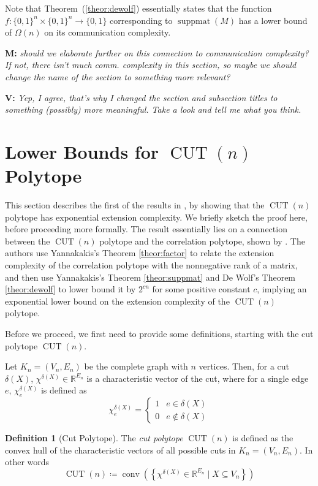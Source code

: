 \documentclass{article}
\theoremstyle{definition}
\newtheorem{definition}[theorem]{Definition}
\theoremstyle{remark}
\newcommand{\bits}{\{0,1\}}
\newcommand{\conv}{\operatorname{conv}}
\newcommand{\suppmat}{\operatorname{suppmat}}
\newcommand{\CUT}{\operatorname{CUT}}
\renewcommand{\R}{\mathbb{R}}
\newcommand{\vnote}[1]{{\color{magenta}\noindent\textbf{V: }\marginpar{****}\textit{{#1}}}}
\newcommand{\mnote}[1]{{\color{blue}\noindent\textbf{M: }\marginpar{****}\textit{{#1}}}}
\begin{document}
Note that Theorem~(\ref{theor:dewolf}) essentially states that the function $f : \bits^n \times \bits^n \to \bits$ corresponding to $\suppmat(M)$ has a lower bound of $\Omega(n)$ on its communication complexity.

\mnote{should we elaborate further on this connection to communication complexity? If not, there isn't much comm. complexity in this section, so maybe we should change the name of the section to something more relevant?}

\vnote{Yep, I agree, that's why I changed the section and subsection titles to something (possibly) more meaningful. Take a look and tell me what you think.}

\section{Lower Bounds for $\CUT(n)$ Polytope}\label{sec:cut-polytope}

This section describes the first of the results in \cite{fiorini}, by showing that the $\CUT(n)$ polytope has exponential extension complexity. We briefly sketch the proof here, before proceeding more formally. The result essentially lies on a connection between the $\CUT(n)$ polytope and the correlation polytope, shown by \cite{de-simone}. The authors use Yannakakis's Theorem \ref{theor:factor} to relate the extension complexity of the correlation polytope with the nonnegative rank of a matrix, and then use Yannakakis's Theorem \ref{theor:suppmat} and De Wolf's Theorem \ref{theor:dewolf} to lower bound it by $2^{cn}$ for some positive constant $c$, implying an exponential lower bound on the extension complexity of the $\CUT(n)$ polytope.

Before we proceed, we first need to provide some definitions, starting with the cut polytope $\CUT(n)$.

Let $K_n = (V_n, E_n)$ be the complete graph with $n$ vertices. Then, for a cut $\delta(X)$, $\chi^{\delta(X)} \in \R^{E_n}$ is a characteristic vector of the cut, where for a single edge $e$, $\chi^{\delta(X)}_e$ is defined as
\[
\chi^{\delta(X)}_e =
\begin{cases}
1 & e \in \delta(X) \\
0 & e \notin \delta(X)
\end{cases}
\]

\begin{definition}[Cut Polytope]\label{def:cut-poly}
The \textit{cut polytope} $\CUT(n)$ is defined as the convex hull of the characteristic vectors of all possible cuts in $K_n = (V_n, E_n)$. In other words
\[
\CUT(n) \coloneqq \conv\left( \left\{ \chi^{\delta(X)} \in \R^{E_n} \mid X \subseteq V_n \right\} \right)
\]
\end{definition}
\end{document}
